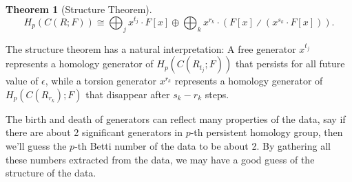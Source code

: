 \documentclass{assignment}[2019/10/15]
\theoremstyle{plain}
\newtheorem{theorem}{Theorem}
\newcommand{\DIV}{{\divslash}}
\begin{document}
  \begin{theorem}[Structure Theorem]
    \begin{equation*}
      H_p(C(R; F))\cong \bigoplus_{j}x^{t_j}\cdot F[x]\oplus\bigoplus_kx^{r_k}\cdot (F[x]\DIV (x^{s_k}\cdot F[x])).
    \end{equation*}
  \end{theorem}

  The structure theorem has a natural interpretation: A free generator $x^{t_j}$ represents a homology generator of $H_p(C(R_{t_j}; F))$ that persists for all future value of $\epsilon$, while a torsion generator $x^{r_k}$ represents a homology generator of $H_p(C(R_{r_k}); F)$ that disappear after $s_k-r_k$ steps.

  The birth and death of generators can reflect many properties of the data, say if there are about 2 significant generators in $p$-th persistent homology group, then we'll guess the $p$-th Betti number of the data to be about 2. By gathering all these numbers extracted from the data, we may have a good guess of the structure of the data.

  \nocite{*}
  \sloppy{}\relax%
  \printbibliography[heading=bibintoc]%
  \fussy%
\end{document}
